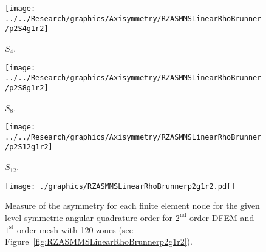 \documentclass[12pt]{article}
\begin{document}
\begin{sidewaysfigure}[!htb]
\centering
\begin{subfigure}{0.33\textwidth}
\texttt{[image: ../../Research/graphics/Axisymmetry/RZASMMSLinearRhoBrunner/p2S4g1r2]}
\caption{$S_4$.}
\end{subfigure}%
\begin{subfigure}{0.33\textwidth}
\texttt{[image: ../../Research/graphics/Axisymmetry/RZASMMSLinearRhoBrunner/p2S8g1r2]}
\caption{$S_8$.}
\end{subfigure}%
\begin{subfigure}{0.33\textwidth}
\texttt{[image: ../../Research/graphics/Axisymmetry/RZASMMSLinearRhoBrunner/p2S12g1r2]}
\caption{$S_{12}$.}
\end{subfigure}
\caption{Relative asymmetry for $2^\text{st}$-order finite elements on a $1^\text{st}$-order mesh for given order of level-symmetric angular quadrature.}
\label{fig:RZASMMSLinearRhoBrunnerp2g1r2}
\end{sidewaysfigure}

\begin{figure}[!htb]
\centering
\texttt{[image: ./graphics/RZASMMSLinearRhoBrunnerp2g1r2.pdf]}
\caption{Measure of the asymmetry for each finite element node for the given level-symmetric angular quadrature order for $2^\text{nd}$-order DFEM and $1^\text{st}$-order mesh with 120 zones (see Figure~\ref{fig:RZASMMSLinearRhoBrunnerp2g1r2}).}
\label{fig:RZASMMSLinearRhoBrunnerp2g1r2Nodes}
\end{figure}
\end{document}
